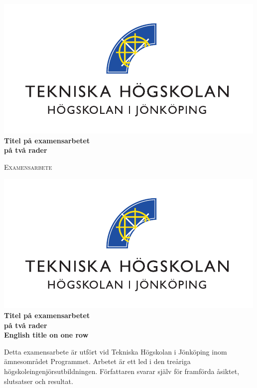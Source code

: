 \documentclass[12pt,a4paper]{article}
\newcommand{\blankpage}{
\newpage
\thispagestyle{empty}
\mbox{}
\newpage
}
\begin{document}
\pagestyle{empty}
\begin{center}


\includegraphics[width=12.2 cm]{Bilder/JTH_cmyk_B-eps-converted-to.pdf}
\vfill
\textbf{\LARGE  Titel på examensarbetet \\ på två rader}
\vfill
%
%

%
%
\vfill
\textsc{\Huge Examensarbete \the\year }\\[0.5cm]
%
%




\blankpage

\includegraphics[width=12.2 cm]{Bilder/JTH_cmyk_B-eps-converted-to.pdf}
\vfill
\textbf{\LARGE  Titel på examensarbetet \\ på två rader}\\[0.6cm]
%
%

\textbf{\large  English title on one row}
%
%
\vfill
{}
\end{center}
\vfill
%
%

\normalsize Detta examensarbete är utfört vid Tekniska Högskolan i Jönköping inom ämnesområdet
Programmet. Arbetet är ett led i den treåriga högskoleingenjörsutbildningen. Författaren svarar själv för framförda åsiktet, slutsatser och resultat.\\[0.4cm]
\\[0.4cm]
\\[0.4cm]
\\[0.4cm]
\\[0.4cm]
\end{document}
